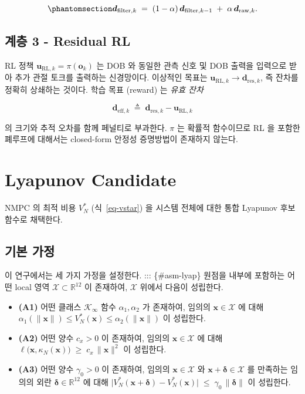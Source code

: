 \documentclass[
  11pt,
]{article}
\theoremstyle{plain}
\theoremstyle{plain}
\theoremstyle{definition}
\theoremstyle{remark}
\begin{document}
\begin{equation}\protect\phantomsection\label{eq-dob-lpf}{
\bm{d}_{\mathrm{filter},k}
\;=\; (1-\alpha)\,\bm{d}_{\mathrm{filter},k-1}
\;+\; \alpha\,\bm{d}_{\mathrm{raw},k}.
}\end{equation}

\subsection{계층 3 - Residual RL}\label{sec-rl}

RL 정책 \(\bm{u}_{\mathrm{RL},k} = \pi(\bm{o}_k)\) 는 DOB 와 동일한 관측
신호 및 DOB 출력을 입력으로 받아 추가 관절 토크를 출력하는 신경망이다.
이상적인 목표는 \(\bm{u}_{\mathrm{RL},k} \to \bm{d}_{\mathrm{res},k}\),
즉 잔차를 정확히 상쇄하는 것이다. 학습 목표 (reward) 는 \emph{유효 잔차}

\[
\bm{d}_{\mathrm{eff},k} \;\triangleq\;
\bm{d}_{\mathrm{res},k} - \bm{u}_{\mathrm{RL},k}
\]

의 크기와 추적 오차를 함께 페널티로 부과한다. \(\pi\) 는 확률적
함수이므로 RL 을 포함한 폐루프에 대해서는 closed-form 안정성 증명방법이
존재하지 않는다.

\section{Lyapunov Candidate}\label{sec-lyap}

NMPC 의 최적 비용 \(V_N^*\) (식~\ref{eq-vstar}) 을 시스템 전체에 대한
통합 Lyapunov 후보 함수로 채택한다.

\subsection{기본 가정}\label{uxae30uxbcf8-uxac00uxc815}

이 연구에서는 세 가지 가정을 설정한다. ::: \{\#asm-lyap\} 원점을 내부에
포함하는 어떤 local 영역 \(\mathcal{X} \subset \mathbb{R}^{12}\) 이
존재하여, \(\mathcal{X}\) 위에서 다음이 성립한다.

\begin{itemize}
\item
  \textbf{(A1)} 어떤 클래스 \(\mathcal{K}_\infty\) 함수
  \(\alpha_1, \alpha_2\) 가 존재하여, 임의의 \(\bm{x}\in\mathcal{X}\) 에
  대해
  \(\alpha_1(\|\bm{x}\|) \le V_N^*(\bm{x}) \le \alpha_2(\|\bm{x}\|)\) 이
  성립한다.
\item
  \textbf{(A2)} 어떤 양수 \(c_x>0\) 이 존재하여, 임의의
  \(\bm{x}\in\mathcal{X}\) 에 대해
  \(\ell\bigl(\bm{x},\kappa_N(\bm{x})\bigr) \;\ge\; c_x\,\|\bm{x}\|^2\)
  이 성립한다.
\item
  \textbf{(A3)} 어떤 양수 \(\gamma_0>0\) 이 존재하여, 임의의
  \(\bm{x}\in\mathcal{X}\) 와 \(\bm{x}+\bm{\delta}\in\mathcal{X}\) 를
  만족하는 임의의 외란 \(\bm{\delta}\in\mathbb{R}^{12}\) 에 대해
  \(\bigl|V_N^*(\bm{x}+\bm{\delta}) - V_N^*(\bm{x})\bigr|
  \;\le\; \gamma_0\,\|\bm{\delta}\|\) 이 성립한다.
\end{itemize}
\end{document}
